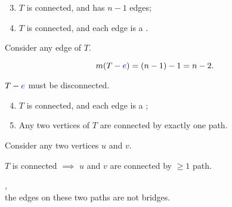 \begin{frame}{}
  \begin{theorem}
    \begin{enumerate}[(1)]
      \setcounter{enumi}{2}
      \setlength{\itemsep}{6pt}
      \item $T$ is connected, and has $n-1$ edges;
      \item $T$ is connected, and each edge is a .
    \end{enumerate}
  \end{theorem}

  \pause
  \vspace{0.30cm}
  \begin{center}
    Consider any edge  of $T$.
  \end{center}

  \pause
  \vspace{-0.20cm}
  \[
    m(T - \textcolor{blue}{e}) = (n - 1) - 1 = n - 2.
  \]

  \pause
  \vspace{-0.20cm}
  \begin{center}
    $T - \textcolor{blue}{e}$ must be disconnected.
  \end{center}
\end{frame}

\begin{frame}{}
  \begin{theorem}
    \begin{enumerate}[(1)]
      \setcounter{enumi}{3}
      \setlength{\itemsep}{6pt}
      \item $T$ is connected, and each edge is a ;
      \item Any two vertices of $T$ are connected by exactly one path.
    \end{enumerate}
  \end{theorem}

  \pause
  \vspace{0.30cm}
  \begin{center}
    Consider any two vertices $u$ and $v$.

    \pause
    \vspace{0.30cm}
    $T$ is connected $\implies$ $u$ and $v$ are connected by $\ge 1$ path.

    \pause
    \vspace{0.60cm}
    , \\[3pt]
    the edges on these two paths are not bridges.
  \end{center}
\end{frame}

